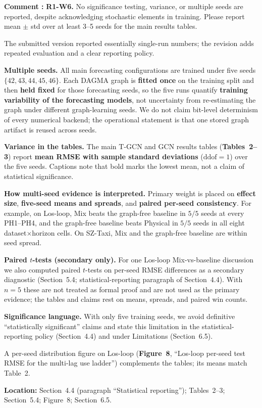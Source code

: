 \documentclass[a4paper,11pt]{article}
\newcounter{commentcounter}
\newcommand{\reviewercomment}[1]{%
    \stepcounter{commentcounter}%
    \begin{reviewerscomment}
        \textbf{Comment \arabic{commentcounter}:} #1
    \end{reviewerscomment}
}
\newcommand{\response}[1]{%
    \begin{myresponse}
        #1
    \end{myresponse}
    \vspace{5mm}
}
\begin{document}
\reviewercomment{
\textbf{R1-W6.} No significance testing, variance, or multiple seeds are reported, despite acknowledging stochastic elements in training. Please report mean $\pm$ std over at least 3--5 seeds for the main results tables.
}

\response{
The submitted version reported essentially single-run numbers; the revision adds repeated evaluation and a clear reporting policy.

\textbf{Multiple seeds.} All main forecasting configurations are trained under five seeds $\{42,43,44,45,46\}$. Each DAGMA graph is \textbf{fitted once} on the training split and then \textbf{held fixed} for those forecasting seeds, so the five runs quantify \textbf{training variability of the forecasting models}, not uncertainty from re-estimating the graph under different graph-learning seeds. We do not claim bit-level determinism of every numerical backend; the operational statement is that one stored graph artifact is reused across seeds.

\textbf{Variance in the tables.} The main T-GCN and GCN results tables (\textbf{Tables~2--3}) report \textbf{mean RMSE with sample standard deviations} ($\mathrm{ddof}=1$) over the five seeds. Captions note that bold marks the lowest mean, not a claim of statistical significance.

\textbf{How multi-seed evidence is interpreted.} Primary weight is placed on \textbf{effect size}, \textbf{five-seed means and spreads}, and \textbf{paired per-seed consistency}. For example, on Los-loop, Mix beats the graph-free baseline in $5/5$ seeds at every PH1--PH4, and the graph-free baseline beats Physical in $5/5$ seeds in all eight dataset$\times$horizon cells. On SZ-Taxi, Mix and the graph-free baseline are within seed spread.

\textbf{Paired $t$-tests (secondary only).} For one Los-loop Mix-vs-baseline discussion we also computed paired $t$-tests on per-seed RMSE differences as a secondary diagnostic (Section~5.4; statistical-reporting paragraph of Section~4.4). With $n=5$ these are not treated as formal proof and are not used as the primary evidence; the tables and claims rest on means, spreads, and paired win counts.

\textbf{Significance language.} With only five training seeds, we avoid definitive ``statistically significant'' claims and state this limitation in the statistical-reporting policy (Section~4.4) and under Limitations (Section~6.5).

A per-seed distribution figure on Los-loop (\textbf{Figure~8}, ``Los-loop per-seed test RMSE for the multi-lag use ladder'') complements the tables; its means match Table~2.

\textbf{Location:} Section~4.4 (paragraph ``Statistical reporting''); Tables~2--3; Section~5.4; Figure~8; Section~6.5.
}
\end{document}
